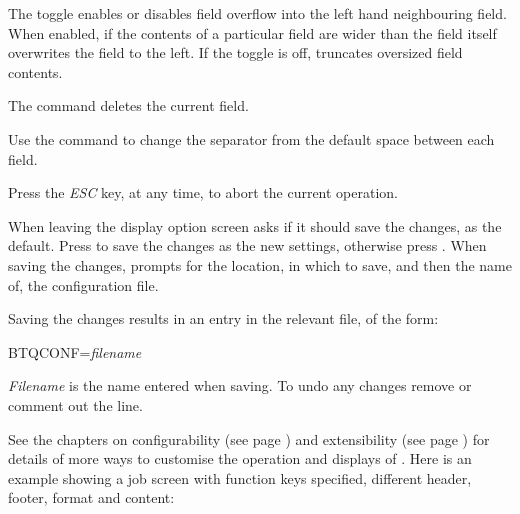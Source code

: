 The \userentry{{\textless}} toggle enables or disables field
overflow into the left hand neighbouring field. When enabled, if the
contents of a particular field are wider than the field itself
\PrBtq{} overwrites the field to the left. If the
toggle is off, \PrBtq{} truncates oversized field
contents.

The  command deletes the current field.

Use the  command to change the separator from
the default space between each field.

Press the \textit{ESC} key, at any time, to abort the current operation.

When leaving the display option screen \BtqName{} asks if it should save the
changes, as the default. Press  to save the
changes as the new settings, otherwise press .
When saving the changes, \BtqName{} prompts for the location, in which to
save, and then the name of, the configuration file.

Saving the changes results in an entry in the relevant \configurationfile{} file, of the form:

\begin{expara}

BTQCONF=\textit{filename}

\end{expara}

\textit{Filename} is the name entered when saving. To undo any changes remove or comment out the  line.

See the chapters on configurability (see page
\pageref{bkm:Configurability}) and extensibility (see page
\pageref{bkm:Extensibility}) for details of more ways to customise the
operation and displays of \PrBtq{}. Here is an
example showing a job screen with function keys specified, different
header, footer, format and content:

